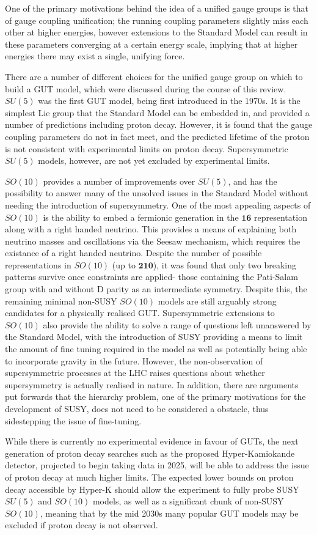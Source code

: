 \documentclass{article}
\begin{document}
One of the primary motivations behind the idea of a unified gauge groups is that of gauge coupling unification; the running coupling parameters slightly miss each other at higher energies, however extensions to the Standard Model can result in these parameters converging at a certain energy scale, implying that at higher energies there may exist a single, unifying force. 

There are a number of different choices for the unified gauge group on which to build a GUT model, which were discussed during the course of this review.
$SU(5)$ was the first GUT model, being first introduced in the 1970s. It is the simplest Lie group that the Standard Model can be embedded in, and provided a number of predictions including proton decay. However, it is found that the gauge coupling parameters do not in fact meet, and the predicted lifetime of the proton is not consistent with experimental limits on proton decay. Supersymmetric $SU(5)$ models, however, are not yet excluded by experimental limits. 

$SO(10)$ provides a number of improvements over $SU(5)$, and has the possibility to answer many of the unsolved issues in the Standard Model without needing the introduction of supersymmetry. One of the most appealing aspects of $SO(10)$ is the ability to embed a fermionic generation in the $\bm{16}$ representation along with a right handed neutrino. This provides a means of explaining both neutrino masses and oscillations via the Seesaw mechanism, which requires the existance of a right handed neutrino. 
Despite the number of possible representations in $SO(10)$ (up to $\bm{210}$), it was found that only two breaking patterns survive once constraints are applied- those containing the Pati-Salam group with and without D parity as an intermediate symmetry. Despite this, the remaining minimal non-SUSY $SO(10)$ models are still arguably strong candidates for a physically realised GUT.
Supersymmetric extensions to $SO(10)$ also provide the ability to solve a range of questions left unanswered by the Standard Model, with the introduction of SUSY providing a means to limit the amount of fine tuning required in the model as well as potentially being able to incorporate gravity in the future. However, the non-observation of supersymmetric processes at the LHC raises questions about whether supersymmetry is actually realised in nature. In addition, there are arguments put forwards that the hierarchy problem, one of the primary motivations for the development of SUSY, does not need to be considered a obstacle, thus sidestepping the issue of fine-tuning.

While there is currently no experimental evidence in favour of GUTs, the next generation of proton decay searches such as the proposed Hyper-Kamiokande detector, projected to begin taking data in 2025, will be able to address the issue of proton decay at much higher limits. The expected lower bounds on proton decay accessible by Hyper-K should allow the experiment to fully probe SUSY $SU(5)$ and $SO(10)$ models, as well as a significant chunk of non-SUSY $SO(10)$, meaning that by the mid 2030s many popular GUT models may be excluded if proton decay is not observed.



\end{document}
